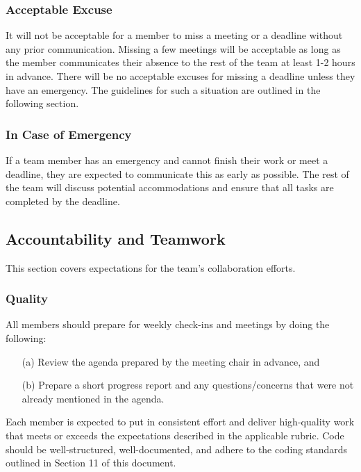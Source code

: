\documentclass{article}
\begin{document}
\subsubsection*{Acceptable Excuse}

It will not be acceptable for a member to miss a meeting or a deadline without
any prior communication. Missing a few meetings will be acceptable as long as
the member communicates their absence to the rest of the team at least 1-2 hours
in advance. There will be no acceptable excuses for missing a deadline unless
they have an emergency. The guidelines for such a situation are outlined in the
following section.

\subsubsection*{In Case of Emergency}

If a team member has an emergency and cannot finish their work or meet a
deadline, they are expected to communicate this as early as possible. The rest
of the team will discuss potential accommodations and ensure that all tasks are
completed by the deadline.

\subsection*{Accountability and Teamwork}

This section covers expectations for the team's collaboration efforts.

\subsubsection*{Quality} 

All members should prepare for weekly check-ins and meetings by doing the
following:

\begin{itemize}
  \item[(a)] Review the agenda prepared by the meeting chair in advance, and
  \item[(b)] Prepare a short progress report and any questions/concerns that
  were not already mentioned in the agenda.
\end{itemize}

\noindent Each member is expected to put in consistent effort and deliver
high-quality work that meets or exceeds the expectations described in the
applicable rubric. Code should be well-structured, well-documented, and adhere
to the coding standards outlined in Section 11 of this document.
\end{document}
